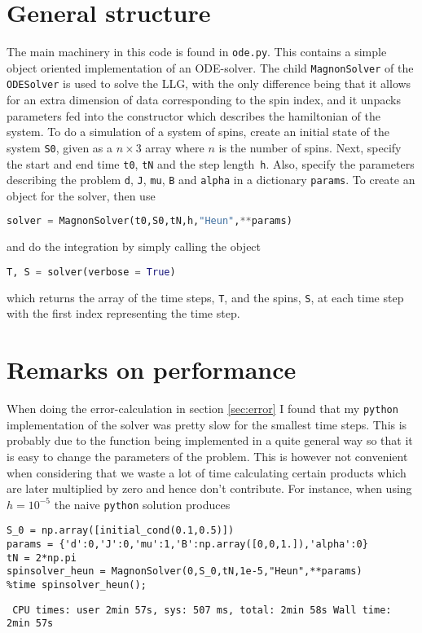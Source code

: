 \section{General structure}

The main machinery in this code is found in \texttt{ode.py}. This contains a simple object oriented implementation of an ODE-solver. The child \texttt{MagnonSolver} of the \texttt{ODESolver} is used to solve the LLG, with the only difference being that it allows for an extra dimension of data corresponding to the spin index, and it unpacks parameters fed into the constructor which describes the hamiltonian of the system. To do a simulation of a system of spins, create an initial state of the system \texttt{S0}, given as a $n\times3$ array where $n$ is the number of spins. Next, specify the start and end time \texttt{t0}, \texttt{tN} and the step length \texttt{h}. Also, specify the parameters describing the problem \texttt{d}, \texttt{J}, \texttt{mu}, \texttt{B} and \texttt{alpha} in a dictionary \texttt{params}. To create an object for the solver, then use

\begin{lstlisting}[language=Python]
solver = MagnonSolver(t0,S0,tN,h,"Heun",**params)
\end{lstlisting}
 
and do the integration by simply calling the object

\begin{lstlisting}[language=Python]
T, S = solver(verbose = True)
\end{lstlisting}

which returns the array of the time steps, \texttt{T}, and the spins, \texttt{S}, at each time step with the first index representing the time step. 

\section{Remarks on performance}
When doing the error-calculation in section \ref{sec:error} I found that my \texttt{python} implementation of the solver was pretty slow for the smallest time steps. This is probably due to the function being implemented in a quite general way so that it is easy to change the parameters of the problem. This is however not convenient when considering that we waste a lot of time calculating certain products which are later multiplied by zero and hence don't contribute. For instance, when using $h = 10^{-5}$ the naive \texttt{python} solution produces
\begin{lstlisting}
S_0 = np.array([initial_cond(0.1,0.5)])
params = {'d':0,'J':0,'mu':1,'B':np.array([0,0,1.]),'alpha':0}
tN = 2*np.pi
spinsolver_heun = MagnonSolver(0,S_0,tN,1e-5,"Heun",**params)
%time spinsolver_heun();
\end{lstlisting}
\texttt{\small
	CPU times: user 2min 57s, sys: 507 ms, total: 2min 58s
	Wall time: 2min 57s
}


